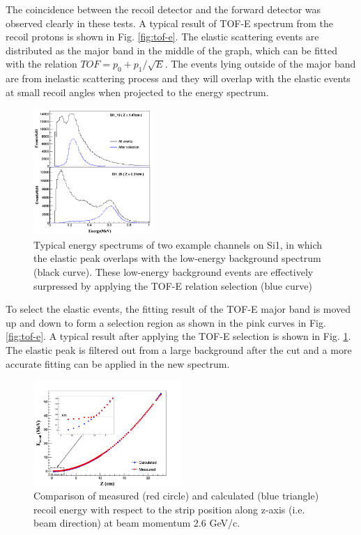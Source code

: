 \documentclass[number,5p]{elsarticle}
\begin{document}
The coincidence between the recoil detector and the forward detector was observed clearly in these tests.
A typical result of TOF-E spectrum from the recoil protons is shown in Fig. \ref{fig:tof-e}. 
The elastic scattering events are distributed as the major band in the middle of the graph, which can be fitted with the relation \(TOF = p_{0} + p_{1}/{\sqrt{E}}\).
The events lying outside of the major band are from inelastic scattering process and they will overlap with the elastic events at small recoil angles when projected to the energy spectrum.

\begin{figure}[htbp]
\centering
\includegraphics[width=0.4\textwidth]{./comparison_tof_e_cut.png}
\caption{Typical energy spectrums of two example channels on Si1, in which the elastic peak overlaps with the low-energy background spectrum (black curve). These low-energy background events are effectively surpressed by applying the TOF-E relation selection (blue curve)}
\label{fig:cut}
\end{figure}

To select the elastic events, the fitting result of the TOF-E major band is moved up and down to form a selection region as shown in the pink curves in Fig. \ref{fig:tof-e}.
A typical result after applying the TOF-E selection is shown in Fig. \ref{fig:cut}.
The elastic peak is filtered out from a large background after the cut and a more accurate fitting can be applied in the new spectrum.

\begin{figure}[htbp]
\centering
\includegraphics[width=0.5\textwidth]{./calc_vs_measured_combined.png}
\caption{
Comparison of measured (red circle) and calculated (blue triangle) recoil energy with respect to the strip position along z-axis (i.e. beam direction) at beam momentum 2.6 GeV/c.}
\label{fig:measured_vs_calculated}
\end{figure}
\end{document}
